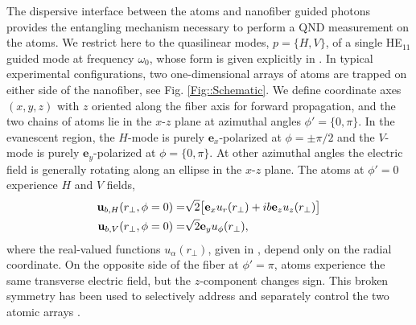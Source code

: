 \documentclass[aps,pra,twocolumn]{revtex4-1} %
\begin{document}
The dispersive interface between the atoms and nanofiber guided photons provides the entangling mechanism necessary to perform a QND measurement on the atoms.  
We restrict here to the quasilinear modes, $p =\{H,V\}$, of a single HE$_{11}$ guided mode at frequency $\omega_0$, whose form is given explicitly in .  
In typical experimental configurations, two one-dimensional arrays of atoms are trapped on either side of the nanofiber, see Fig. \ref{Fig::Schematic}. 
We define coordinate axes $(x,y,z)$ with $z$ oriented along the fiber axis for forward propagation, and the two chains of atoms lie in the $x$-$z$ plane at azimuthal angles $\phi' = \{0, \pi\}$.
In the evanescent region, the $H$-mode is purely $\mathbf{e}_x$-polarized at $\phi = \pm \pi/2$ and the $V$-mode is purely $\mathbf{e}_y$-polarized at $\phi = \{0,\pi\}$.  
At other azimuthal angles the electric field is generally rotating along an ellipse in the $x$-$z$ plane.  The atoms at $\phi'=0$ experience $H$ and $V$ fields,
\begin{subequations}
	\begin{align}
		\mathbf{u}_{b,H}(r_\perp, \phi = 0) = & \sqrt{2} \big[ \mathbf{e}_x u_r(r_\perp)+  i b \mathbf{e}_z  u_z(r_\perp) \big] \\
		\mathbf{u}_{b,V}(r_\perp, \phi = 0) = & \sqrt{2} \mathbf{e}_y u_\phi(r_\perp), 
	\end{align}
\end{subequations}
where the real-valued functions $u_\alpha(r_\perp)$, given in , depend only on the radial coordinate.  
On the opposite side of the fiber at $\phi' = \pi$, atoms experience the same transverse electric field, but the $z$-component changes sign.   This broken symmetry has been used to selectively address and separately control the two atomic arrays \cite{mitsch_exploiting_2014, mitsch_quantum_2014, sayrin_storage_2015}.  
\end{document}

